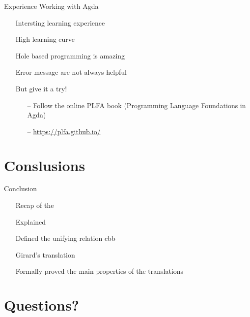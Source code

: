 \documentclass{beamer}
\theoremstyle{definition}
\begin{document}
  \begin{frame}{Experience Working with Agda}
    \begin{itemize}
      \item[\textbullet] Intersting learning experience
      \item[\textbullet] High learning curve
      \item[\textbullet] Hole based programming is amazing
      \item[\textbullet] Error message are not always helpful
      \item[\textbullet] But give it a try! \pause
        \begin{itemize}
          \item[--] Follow the online \alert{PLFA} book (Programming Language Foundations in Agda)
          \item[--] \alert{\url{https://plfa.github.io/}} 
        \end{itemize}  
    \end{itemize}
  \end{frame}

  \section{Conslusions}
  
  \begin{frame}{Conclusion}
    \begin{itemize}
      \item[\textbullet] Recap of the \lc
      \item[\textbullet] Explained \alert{\lab}
      \item[\textbullet] Defined the unifying relation \alert{\textsf{cbb}}
      \item[\textbullet] \alert{Girard's} translation
      \item[\textbullet] Formally proved the main properties of the translations    
    \end{itemize}
  \end{frame}

  \section{Questions?}
\end{document}
